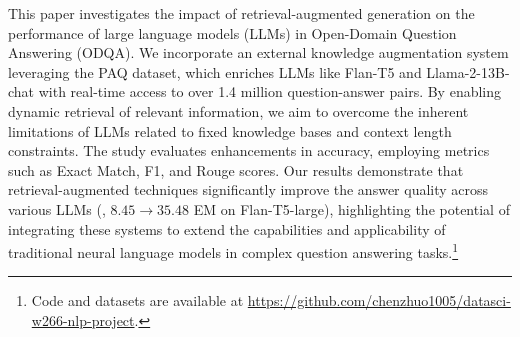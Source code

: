 This paper investigates the impact of retrieval-augmented generation on the performance of large language models (LLMs) in Open-Domain Question Answering (ODQA). We incorporate an external knowledge augmentation system leveraging the PAQ dataset, which enriches LLMs like Flan-T5 and Llama-2-13B-chat with real-time access to over 1.4 million question-answer pairs. By enabling dynamic retrieval of relevant information, we aim to overcome the inherent limitations of LLMs related to fixed knowledge bases and context length constraints. The study evaluates enhancements in accuracy, employing metrics such as Exact Match, F1, and Rouge scores. Our results demonstrate that retrieval-augmented techniques significantly improve the answer quality across various LLMs (\eg, $8.45 \rightarrow 35.48$ EM on Flan-T5-large), highlighting the potential of integrating these systems to extend the capabilities and applicability of traditional neural language models in complex question answering tasks.\footnote{Code and datasets are available at \url{https://github.com/chenzhuo1005/datasci-w266-nlp-project}.}